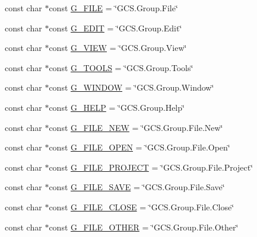 \begin{DoxyCompactItemize}
\item 
const char $\ast$const \hyperlink{group___core_plugin_ga68db58071fb0d35ee9d75b0b2186511a}{\-G\-\_\-\-F\-I\-L\-E} = \char`\"{}\-G\-C\-S.\-Group.\-File\char`\"{}
\item 
const char $\ast$const \hyperlink{group___core_plugin_gabb38089b62cacebd11469129718e295f}{\-G\-\_\-\-E\-D\-I\-T} = \char`\"{}\-G\-C\-S.\-Group.\-Edit\char`\"{}
\item 
const char $\ast$const \hyperlink{group___core_plugin_gaf8e643a4a904dceadb52cf47ba265ef9}{\-G\-\_\-\-V\-I\-E\-W} = \char`\"{}\-G\-C\-S.\-Group.\-View\char`\"{}
\item 
const char $\ast$const \hyperlink{group___core_plugin_ga70bfb468e022981f48ed5b8ea5e8bce1}{\-G\-\_\-\-T\-O\-O\-L\-S} = \char`\"{}\-G\-C\-S.\-Group.\-Tools\char`\"{}
\item 
const char $\ast$const \hyperlink{group___core_plugin_ga5831ce204fcff78e2b9a0981d6af4a4c}{\-G\-\_\-\-W\-I\-N\-D\-O\-W} = \char`\"{}\-G\-C\-S.\-Group.\-Window\char`\"{}
\item 
const char $\ast$const \hyperlink{group___core_plugin_ga227137f1a0f845bb147764080eb7f790}{\-G\-\_\-\-H\-E\-L\-P} = \char`\"{}\-G\-C\-S.\-Group.\-Help\char`\"{}
\item 
const char $\ast$const \hyperlink{group___core_plugin_ga8075f826c38d7ad64455fce1e27364b9}{\-G\-\_\-\-F\-I\-L\-E\-\_\-\-N\-E\-W} = \char`\"{}\-G\-C\-S.\-Group.\-File.\-New\char`\"{}
\item 
const char $\ast$const \hyperlink{group___core_plugin_ga0f564afaaccdd8bfb5d35a745f2aa002}{\-G\-\_\-\-F\-I\-L\-E\-\_\-\-O\-P\-E\-N} = \char`\"{}\-G\-C\-S.\-Group.\-File.\-Open\char`\"{}
\item 
const char $\ast$const \hyperlink{group___core_plugin_ga05ac3ebb994ab8c62e2f0ba17dc12b48}{\-G\-\_\-\-F\-I\-L\-E\-\_\-\-P\-R\-O\-J\-E\-C\-T} = \char`\"{}\-G\-C\-S.\-Group.\-File.\-Project\char`\"{}
\item 
const char $\ast$const \hyperlink{group___core_plugin_ga71aab5cd1940b131cfa9089cf7b6a6cc}{\-G\-\_\-\-F\-I\-L\-E\-\_\-\-S\-A\-V\-E} = \char`\"{}\-G\-C\-S.\-Group.\-File.\-Save\char`\"{}
\item 
const char $\ast$const \hyperlink{group___core_plugin_ga28053f6405254961f912a4635c3b5ea7}{\-G\-\_\-\-F\-I\-L\-E\-\_\-\-C\-L\-O\-S\-E} = \char`\"{}\-G\-C\-S.\-Group.\-File.\-Close\char`\"{}
\item 
const char $\ast$const \hyperlink{group___core_plugin_ga8ec0d7c0e60fc2e09f6936d0d385475d}{\-G\-\_\-\-F\-I\-L\-E\-\_\-\-O\-T\-H\-E\-R} = \char`\"{}\-G\-C\-S.\-Group.\-File.\-Other\char`\"{}

\end{DoxyCompactItemize}
